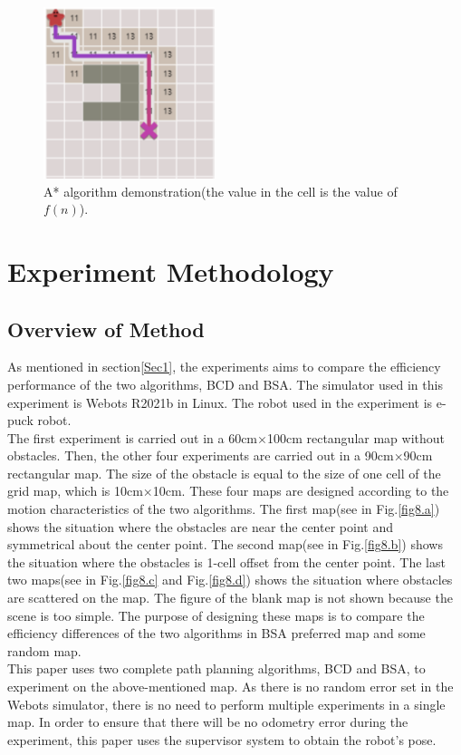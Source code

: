 \documentclass[conference]{IEEEtran}
\begin{document}
\setlength{\belowcaptionskip}{-1cm}
\begin{figure}[htbp]
\centerline{\includegraphics[width=5cm,height=5cm]{RS_Report/astar.png}}
\caption{A* algorithm demonstration(the value in the cell is the value of $f(n)$).}
\label{fig4}
\end{figure}



\section{Experiment Methodology}

\subsection{Overview of Method}
As mentioned in section\ref{Sec1}, the experiments aims to compare the efficiency performance of the two algorithms, BCD and BSA. The simulator used in this experiment is Webots R2021b in Linux. The robot used in the experiment is e-puck robot\cite{Cyberboticswebsite}.\\
The first experiment is carried out in a 60cm$\times$100cm rectangular map without obstacles. Then, the other four experiments are carried out in a 90cm$\times$90cm rectangular map. The size of the obstacle is equal to the size of one cell of the grid map, which is 10cm$\times$10cm. These four maps are designed according to the motion characteristics of the two algorithms. The first map(see in Fig.\ref{fig8.a}) shows the situation where the obstacles are near the center point and symmetrical about the center point. The second map(see in Fig.\ref{fig8.b}) shows the situation where the obstacles is 1-cell offset from the center point. The last two maps(see in Fig.\ref{fig8.c} and Fig.\ref{fig8.d}) shows the situation where obstacles are scattered on the map. The figure of the blank map is not shown because the scene is too simple. The purpose of designing these maps is to compare the efficiency differences of the two algorithms in BSA preferred map and some random map.\\
This paper uses two complete path planning algorithms, BCD and BSA, to experiment on the above-mentioned map. As there is no random error set in the Webots simulator, there is no need to perform multiple experiments in a single map. In order to ensure that there will be no odometry error during the experiment, this paper uses the supervisor system to obtain the robot's pose. 
\end{document}

